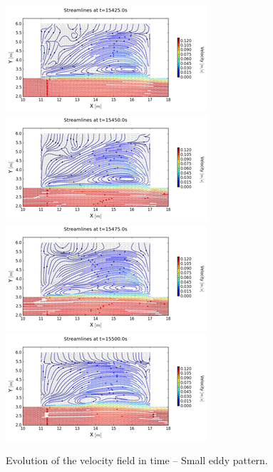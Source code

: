 \begin{figure}
 \centering
\includegraphics{img/image141}
\includegraphics{img/image142}
\includegraphics{img/image143}
\includegraphics{img/image144}

 \caption{Evolution of the velocity field in time -- Small eddy pattern.}\label{fig:cavity:evol_small}
\end{figure}

